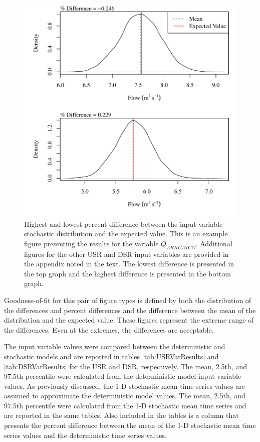 \begin{linenumbers}
\begin{figure}[htbp]
\centering
	\includegraphics[width=6in]{"Figures/Results_USR/V min-max pdiff qin"}
	\caption[Highest and lowest percent difference between the input variable stochastic distribution and the expected value.]{Highest and lowest percent difference between the input variable stochastic distribution and the expected value.  This is an example figure presenting the results for the variable $Q_{ARKCATCO}$.  Additional figures for the other USR and DSR input variables are provided in the appendix noted in the text.  The lowest difference is presented in the top graph and the highest difference is presented in the bottom graph.}
	\label{fig:ExampleMinMaxPDiff}
\end{figure}

Goodness-of-fit for this pair of figure types is defined by both the distribution of the differences and percent differences and the difference between the mean of the distribution and the expected value.  These figures represent the extreme range of the differences.  Even at the extremes, the differences are acceptable.

The input variable values were compared between the deterministic and stochastic models and are reported in tables \ref{tab:USRVarResults} and \ref{tab:DSRVarResults} for the USR and DSR, respectively.  The mean, 2.5th, and 97.5th percentile were calculated from the deterministic model input variable values.  As previously discussed, the 1-D stochastic mean time series values are assumed to approximate the deterministic model values.  The mean, 2.5th, and 97.5th percentile were calculated from the 1-D stochastic mean time series and are reported in the same tables.  Also included in the tables is a column that presents the percent difference between the mean of the 1-D stochastic mean time series values and the deterministic time series values.  


\end{linenumbers}
